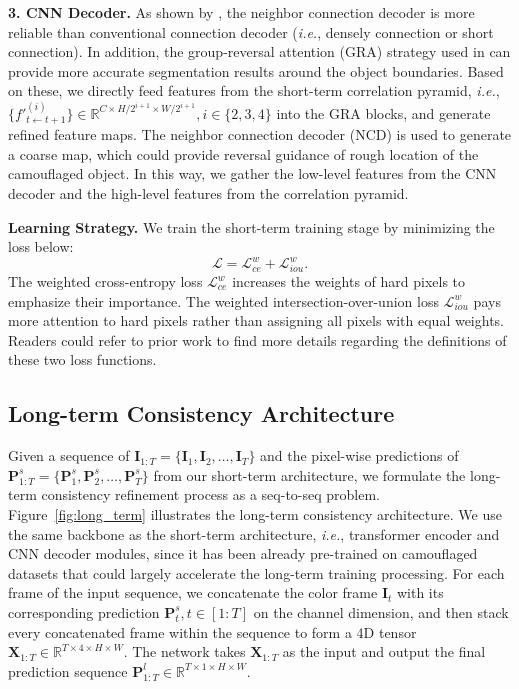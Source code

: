 \documentclass[10pt,twocolumn,letterpaper]{article}
\def\ie{\emph{i.e.}}
\def\figref#1{Figure~\ref{#1}}
\begin{document}
\noindent\textbf{3. CNN Decoder.}
As shown  by \cite{fan2021concealed}, the neighbor connection decoder is more reliable than conventional connection decoder (\ie, densely connection or short connection). In addition, the group-reversal attention (GRA) strategy used in \cite{fan2021concealed} can provide more accurate segmentation results around the object boundaries. 
Based on these, we directly feed features from the short-term correlation pyramid, \ie, $\{f'^{(i)}_{t \leftarrow t+1} \} \in \mathbb{R}^{C \times H/2^{i+1} \times W/2^{i+1}}, i \in \{2, 3, 4\}$ into the GRA blocks, and generate  refined feature maps. The neighbor connection decoder (NCD) is used to generate a coarse map, which could provide reversal guidance of rough location of the camouflaged object. In this way, we gather the low-level features from the CNN decoder and the high-level features from the correlation pyramid.  



\noindent\textbf{Learning Strategy.}
We train the short-term training stage by minimizing the loss below: 
\begin{equation}
\mathcal{L} = \mathcal{L}^{w}_{ce} + \mathcal{L}^{w}_{iou}.
\end{equation}
The weighted cross-entropy loss $\mathcal{L}^{w}_{ce}$ increases the weights of hard pixels to emphasize their importance. The weighted intersection-over-union loss $\mathcal{L}^{w}_{iou}$ pays more attention to hard pixels rather than assigning all pixels with equal weights. Readers could refer to prior work \cite{wei2020f3net} to find more details regarding the definitions of these two loss functions. 

\subsection{Long-term Consistency Architecture}
Given a sequence of $\mathbf{I}_{1:T} = \{ \mathbf{I}_1, \mathbf{I}_2, \dots, \mathbf{I}_T \}$ and the pixel-wise predictions of $\mathbf{P}^{s}_{1:T} = \{ \mathbf{P}^{s}_1, \mathbf{P}^{s}_2, \dots, \mathbf{P}^{s}_T \}$ from our short-term architecture, we formulate the long-term consistency refinement process as a seq-to-seq problem. 
\figref{fig:long_term} illustrates the long-term consistency architecture. We use the same backbone as the short-term architecture, \ie, transformer encoder and CNN decoder modules, since it has been already pre-trained on camouflaged datasets that could largely accelerate the long-term training processing. 
For each frame of the input sequence, we concatenate the color frame $\mathbf{I}_t$ with its corresponding prediction $\mathbf{P}^s_t, t \in [1:T]$ on the channel dimension, and then stack every concatenated frame within the sequence to form a 4D tensor $\mathbf{X}_{1:T} \in \mathbb{R}^{ T \times 4 \times H \times W } $. The network takes $\mathbf{X}_{1:T}$ as the input and output the final prediction sequence $\mathbf{P}^{l}_{1:T} \in \mathbb{R}^{ T \times 1 \times H \times W}$.
\end{document}
